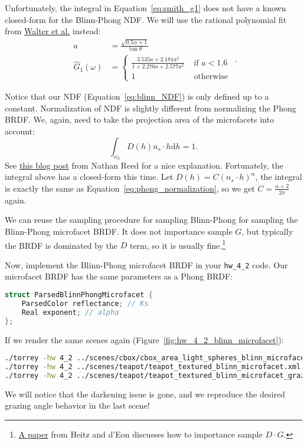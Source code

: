 Unfortunately, the integral in Equation~\eqref{eq:smith_g1} does not have a known closed-form for the Blinn-Phong NDF. We will use the rational polynomial fit from \href{http://www.graphics.cornell.edu/~bjw/microfacetbsdf.pdf}{Walter et al.} instead:
\begin{equation}
\begin{aligned}
a &= \frac{\sqrt{0.5 \alpha + 1}}{\tan\theta} \\
\hat{G}_1(\omega) &= \begin{cases}
\frac{3.535a + 2.181a^2}{1 + 2.276a + 2.577a^2} & \text{ if } a < 1.6 \\
1 & \text{ otherwise}
\end{cases}
\end{aligned}.
\end{equation}

Notice that our NDF (Equation~\eqref{eq:blinn_NDF}) is only defined up to a constant. Normalization of NDF is slightly different from normalizing the Phong BRDF. We, again, need to take the projection area of the microfacets into account:
\begin{equation}
\int_{\omega_h} D(h) n_s \cdot h \mathrm{d}h = 1.
\end{equation}
See \href{https://www.reedbeta.com/blog/hows-the-ndf-really-defined/}{this blog post} from Nathan Reed for a nice explanation. Fortunately, the integral above has a closed-form this time. Let $D(h) = C \left(n_s \cdot h\right)^{\alpha}$, the integral is exactly the same as Equation~\eqref{eq:phong_normalization}, so we get $C = \frac{\alpha + 2}{2\pi}$ again.

We can reuse the sampling procedure for sampling Blinn-Phong for sampling the Blinn-Phong microfacet BRDF. It does not importance sample $G$, but typically the BRDF is dominated by the $D$ term, so it is usually fine.\footnote{\href{https://hal.inria.fr/hal-00996995/en}{A paper} from Heitz and d'Eon discusses how to importance sample $D \cdot G$.}

Now, implement the Blinn-Phong microfacet BRDF in your \lstinline{hw_4_2} code. Our microfacet BRDF has the same parameters as a Phong BRDF:
\begin{lstlisting}[language=C++]
struct ParsedBlinnPhongMicrofacet {
    ParsedColor reflectance; // Ks
    Real exponent; // alpha
};
\end{lstlisting}

If we render the same scenes again (Figure~\ref{fig:hw_4_2_blinn_microfacet}):
\begin{lstlisting}[language=bash]
./torrey -hw 4_2 ../scenes/cbox/cbox_area_light_spheres_blinn_microfacet.xml
./torrey -hw 4_2 ../scenes/teapot/teapot_textured_blinn_microfacet.xml
./torrey -hw 4_2 ../scenes/teapot/teapot_textured_blinn_microfacet_grazing_view.xml
\end{lstlisting}
We will notice that the darkening issue is gone, and we reproduce the desired grazing angle behavior in the last scene!

